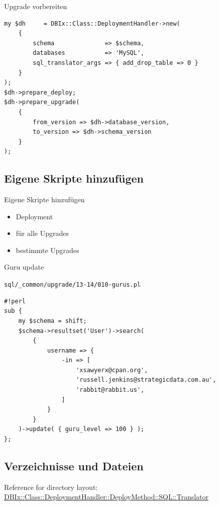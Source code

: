 \begin{frame}[fragile]{Upgrade vorbereiten}
\begin{lstlisting}
my $dh     = DBIx::Class::DeploymentHandler->new(
    {
        schema              => $schema,
        databases           => 'MySQL',
        sql_translator_args => { add_drop_table => 0 }
    }
);
$dh->prepare_deploy;
$dh->prepare_upgrade(
    {
        from_version => $dh->database_version,
        to_version => $dh->schema_version
    }
);
\end{lstlisting}
\end{frame}

\subsection{Eigene Skripte hinzufügen}

\begin{frame}{Eigene Skripte hinzufügen}
\begin{itemize}
\item Deployment
\item für alle Upgrades
\item bestimmte Upgrades
\end{itemize}
\end{frame}

\begin{frame}[fragile]{Guru update}

\verb|sql/_common/upgrade/13-14/010-gurus.pl|

\begin{lstlisting}
#!perl
sub {
    my $schema = shift;
    $schema->resultset('User')->search(
        {
            username => {
                -in => [
                    'xsawyerx@cpan.org',
                    'russell.jenkins@strategicdata.com.au',
                    'rabbit@rabbit.us',
                ]
            }
        }
    )->update( { guru_level => 100 } );
};

\end{lstlisting}
\end{frame}

\subsection{Verzeichnisse und Dateien}

Reference for directory layout:
\href{https://metacpan.org/pod/DBIx::Class::DeploymentHandler::DeployMethod::SQL::Translator}{DBIx::Class::DeploymentHandler::DeployMethod::SQL::Translator}

